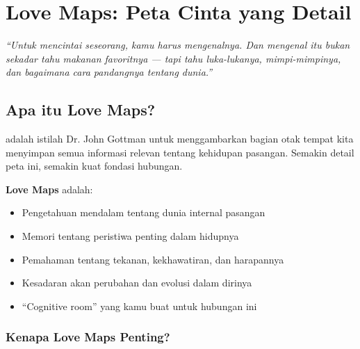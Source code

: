 \chapter{Love Maps: Peta Cinta yang Detail}

\begin{insightbox}
\textit{``Untuk mencintai seseorang, kamu harus mengenalnya. Dan mengenal itu bukan sekadar tahu makanan favoritnya --- tapi tahu luka-lukanya, mimpi-mimpinya, dan bagaimana cara pandangnya tentang dunia.''}
\end{insightbox}

\section{Apa itu Love Maps?}

 adalah istilah Dr. John Gottman untuk menggambarkan bagian otak tempat kita menyimpan semua informasi relevan tentang kehidupan pasangan. Semakin detail peta ini, semakin kuat fondasi hubungan.

\begin{praktikbox}
\textbf{Love Maps} adalah:
\begin{itemize}
    \item Pengetahuan mendalam tentang dunia internal pasangan
    \item Memori tentang peristiwa penting dalam hidupnya
    \item Pemahaman tentang tekanan, kekhawatiran, dan harapannya
    \item Kesadaran akan perubahan dan evolusi dalam dirinya
    \item ``Cognitive room'' yang kamu buat untuk hubungan ini
\end{itemize}
\end{praktikbox}

\subsection{Kenapa Love Maps Penting?}

\begin{center}
\end{center}

